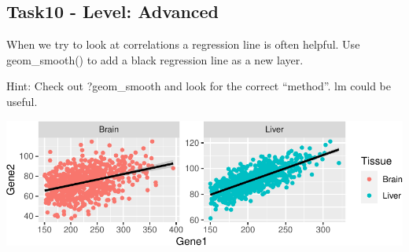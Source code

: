 \documentclass[
  7pt,
]{article}
\begin{document}
\hypertarget{task10---level-advanced}{%
\subsection{Task10 - Level: Advanced}\label{task10---level-advanced}}

When we try to look at correlations a regression line is often helpful.
Use geom\_smooth() to add a black regression line as a new layer.

Hint: Check out ?geom\_smooth and look for the correct ``method''. lm
could be useful.

\begin{center}\includegraphics{dplyr_tidyr_ggplot2_files/figure-latex/task10-1} \end{center}
\end{document}
